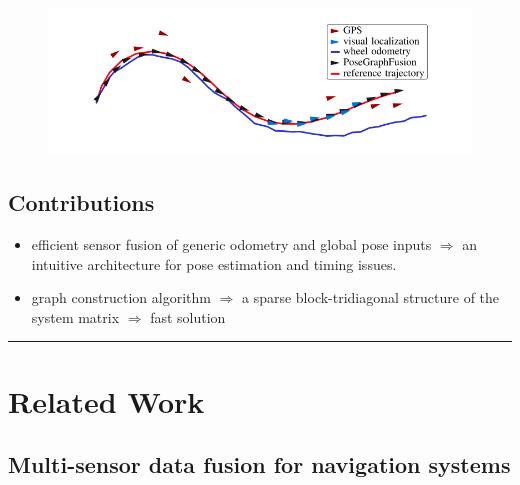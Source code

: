 \documentclass[letterpaper,10pt]{article}
\begin{document}
\begin{figure}[!ht]
	\centering
	\includegraphics[width=15cm]{./img/posefusion.png}
\end{figure}

\subsection{Contributions}

\begin{itemize}
	\item efficient sensor fusion of generic odometry and global pose inputs $\Rightarrow$ an intuitive architecture for pose estimation and timing issues.
	\item graph construction algorithm $\Rightarrow$ a sparse block-tridiagonal structure of the system matrix $\Rightarrow$ fast solution
\end{itemize}

\begin{center}\rule{\textwidth}{1pt}\end{center}
\section{Related Work}

\subsection{Multi-sensor data fusion for navigation systems}
\end{document}
